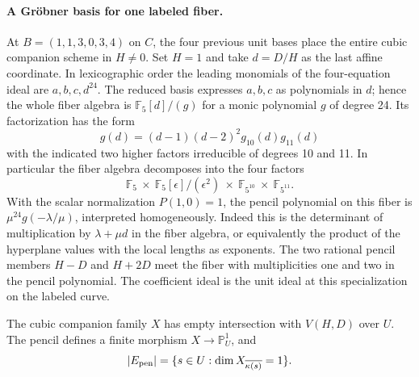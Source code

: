 \paragraph{A Gröbner basis for one labeled fiber.}
At \(B=(1,1,3,0,3,4)\) on \(C\), the four previous unit bases place
the entire cubic companion scheme in \(H\ne0\). Set \(H=1\) and
take \(d=D/H\) as the last affine coordinate. In lexicographic order
the leading monomials of the four-equation ideal are \(a,b,c,d^{24}\).
The reduced basis expresses \(a,b,c\) as polynomials in \(d\); hence
the whole fiber algebra is \(\mathbb F_5[d]/(g)\) for a monic
polynomial \(g\) of degree 24. Its factorization has the form
\[
           g(d)=(d-1)(d-2)^2g_{10}(d)g_{11}(d)
\]
with the indicated two higher factors irreducible of degrees 10 and 11.
In particular the fiber algebra decomposes into the four factors
\[
 \mathbb F_5 \ \times\ \mathbb F_5[\epsilon]/(\epsilon^2)
       \ \times\ \mathbb F_{5^{10}}\ \times\ \mathbb F_{5^{11}}.
\]
With the scalar normalization \(P(1,0)=1\), the pencil polynomial on
this fiber is \(\mu^{24}g(-\lambda/\mu)\), interpreted homogeneously.
Indeed this is the determinant of multiplication by \(\lambda+\mu d\)
in the fiber algebra, or equivalently the product of the hyperplane
values with the local lengths as exponents. The two rational pencil
members \(H-D\) and \(H+2D\) meet the fiber with multiplicities one
and two in the pencil polynomial. The coefficient ideal is the unit
ideal at this specialization on the labeled curve.

\begin{proposition}
\label{prop:level-pencil-center}
The cubic companion family \(X\) has empty intersection with \(V(H,D)\)
over \(U\). The pencil defines a finite morphism
\(X\to\mathbb P^1_U\), and
\[
               |E_{\rm pen}|=\{s\in U:\dim X_{\overline{\kappa(s)}}=1\}.
\]
\end{proposition}

